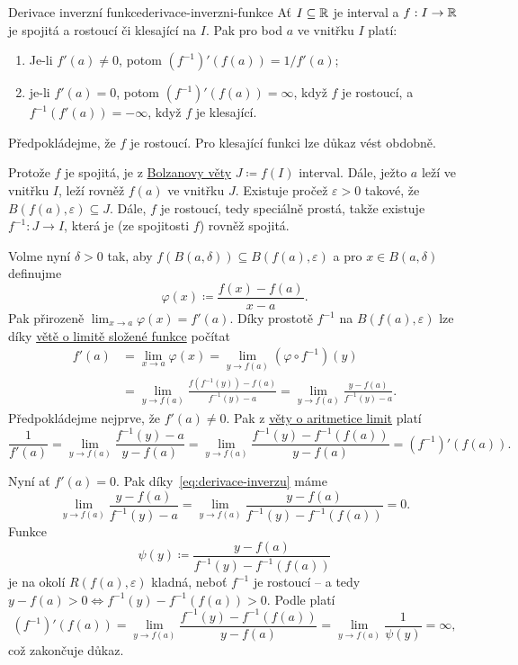 \begin{theorem}{Derivace inverzní funkce}{derivace-inverzni-funkce}
 Ať $I \subseteq \mathbb{R}$ je interval a $f:I \to \mathbb{R}$ je spojitá a rostoucí či
 klesající na $I$. Pak pro bod $a$ ve vnitřku $I$ platí:
 \begin{enumerate}
  \item Je-li $f'(a) \neq 0$, potom $(f^{-1})'(f(a)) = 1 / f'(a)$;
  \item je-li $f'(a) = 0$, potom $(f^{-1})'(f(a)) = \infty$, když $f$ je
   rostoucí, a $f^{-1}(f'(a)) = -\infty$, když $f$ je klesající.
 \end{enumerate}
\end{theorem}

\begin{thmproof}
 Předpokládejme, že $f$ je rostoucí. Pro klesající funkci lze důkaz vést
 obdobně.

 Protože $f$ je spojitá, je z \hyperref[thm:bolzanova]{Bolzanovy věty} $J
 \coloneqq f(I)$ interval. Dále, ježto $a$ leží ve vnitřku $I$, leží rovněž
 $f(a)$ ve vnitřku $J$. Existuje pročež $\varepsilon>0$ takové, že
 $B(f(a),\varepsilon) \subseteq J$. Dále, $f$ je rostoucí, tedy speciálně
 prostá, takže existuje $f^{-1}:J \to I$, která je (ze spojitosti $f$) rovněž
 spojitá.

 Volme nyní $\delta>0$ tak, aby $f(B(a,\delta)) \subseteq B(f(a),\varepsilon)$ a
 pro $x \in B(a,\delta)$ definujme
 \[
  \varphi(x) \coloneqq \frac{f(x) - f(a)}{x - a}.
 \]
 Pak přirozeně $\lim_{x \to a} \varphi(x) = f'(a)$. Díky prostotě $f^{-1}$ na
 $B(f(a),\varepsilon)$ lze díky \hyperref[thm:limita-slozene-funkce]{větě o
 limitě složené funkce} počítat
 \begin{equation}
  \label{eq:derivace-inverzu}
  \tag{$\heartsuit$}
  \begin{split}
   f'(a) &= \lim_{x \to a} \varphi(x) = \lim_{y \to f(a)} (\varphi \circ
   f^{-1})(y)\\
         &= \lim_{y \to f(a)} \frac{f(f^{-1}(y)) - f(a)}{f^{-1}(y) - a} = \lim_{y
         \to f(a)} \frac{y - f(a)}{f^{-1}(y) - a}.
  \end{split}
 \end{equation}
 Předpokládejme nejprve, že $f'(a) \neq 0$. Pak z
 \hyperref[thm:aritmetika-limit-funkci]{věty o aritmetice limit} platí
 \[
  \frac{1}{f'(a)} = \lim_{y \to f(a)} \frac{f^{-1}(y) - a}{y - f(a)} = \lim_{y
  \to f(a)} \frac{f^{-1}(y) - f^{-1}(f(a))}{y - f(a)} = (f^{-1})'(f(a)).
 \]
 
 Nyní ať $f'(a) = 0$. Pak díky~\eqref{eq:derivace-inverzu} máme
 \[
  \lim_{y \to f(a)} \frac{y-f(a)}{f^{-1}(y) - a} = \lim_{y \to f(a)}
  \frac{y-f(a)}{f^{-1}(y) - f^{-1}(f(a))} = 0.
 \]
 Funkce
 \[
  \psi(y) \coloneqq \frac{y-f(a)}{f^{-1}(y) - f^{-1}(f(a))}
 \]
 je na okolí $R(f(a),\varepsilon)$ kladná, neboť $f^{-1}$ je rostoucí -- a tedy
 $y - f(a) > 0 \Leftrightarrow f^{-1}(y) - f^{-1}(f(a)) > 0$. Podle
  platí
 \[
  (f^{-1})'(f(a)) = \lim_{y \to f(a)} \frac{f^{-1}(y) - f^{-1}(f(a))}{y - f(a)}
  = \lim_{y \to f(a)} \frac{1}{\psi(y)} = \infty,
 \]
 což zakončuje důkaz.
\end{thmproof}

